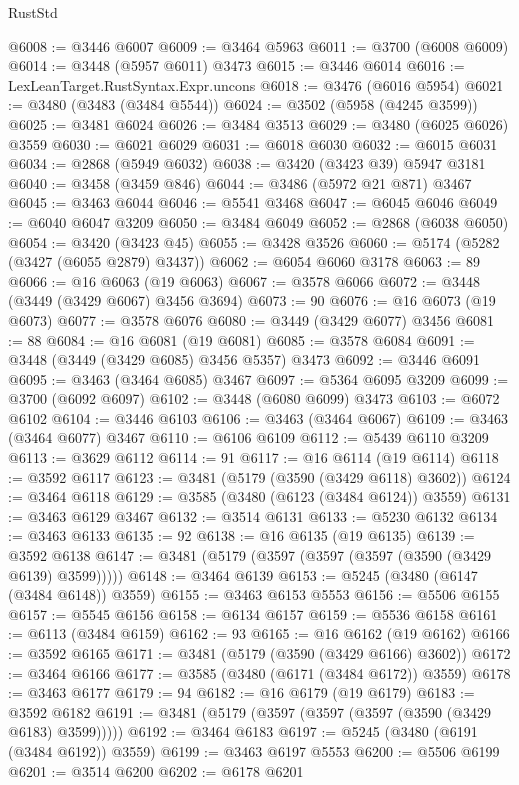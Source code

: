 \begin{lexlean}{RustStd}
\begin{coremodule}
{\begin{coremodule}
{{{{{{{{{{{{{{{{{{{{{{{{{{{{{{{{{{{{{{{{{{{{{{{{{{{{{{{{{{{{{{{{{{{{{{{{{{{{{{{{{{{{{@6008 := @3446 @6007
@6009 := @3464 @5963
@6011 := @3700 (@6008 @6009)
@6014 := @3448 (@5957 @6011) @3473
@6015 := @3446 @6014
@6016 := LexLeanTarget.RustSyntax.Expr.uncons
@6018 := @3476 (@6016 @5954)
@6021 := @3480 (@3483 (@3484 @5544))
@6024 := @3502 (@5958 (@4245 @3599))
@6025 := @3481 @6024
@6026 := @3484 @3513
@6029 := @3480 (@6025 @6026) @3559
@6030 := @6021 @6029
@6031 := @6018 @6030
@6032 := @6015 @6031
@6034 := @2868 (@5949 @6032)
@6038 := @3420 (@3423 @39) @5947 @3181
@6040 := @3458 (@3459 @846)
@6044 := @3486 (@5972 @21 @871) @3467
@6045 := @3463 @6044
@6046 := @5541 @3468
@6047 := @6045 @6046
@6049 := @6040 @6047 @3209
@6050 := @3484 @6049
@6052 := @2868 (@6038 @6050)
@6054 := @3420 (@3423 @45)
@6055 := @3428 @3526
@6060 := @5174 (@5282 (@3427 (@6055 @2879) @3437))
@6062 := @6054 @6060 @3178
@6063 := 89
@6066 := @16 @6063 (@19 @6063)
@6067 := @3578 @6066
@6072 := @3448 (@3449 (@3429 @6067) @3456 @3694)
@6073 := 90
@6076 := @16 @6073 (@19 @6073)
@6077 := @3578 @6076
@6080 := @3449 (@3429 @6077) @3456
@6081 := 88
@6084 := @16 @6081 (@19 @6081)
@6085 := @3578 @6084
@6091 := @3448 (@3449 (@3429 @6085) @3456 @5357) @3473
@6092 := @3446 @6091
@6095 := @3463 (@3464 @6085) @3467
@6097 := @5364 @6095 @3209
@6099 := @3700 (@6092 @6097)
@6102 := @3448 (@6080 @6099) @3473
@6103 := @6072 @6102
@6104 := @3446 @6103
@6106 := @3463 (@3464 @6067)
@6109 := @3463 (@3464 @6077) @3467
@6110 := @6106 @6109
@6112 := @5439 @6110 @3209
@6113 := @3629 @6112
@6114 := 91
@6117 := @16 @6114 (@19 @6114)
@6118 := @3592 @6117
@6123 := @3481 (@5179 (@3590 (@3429 @6118) @3602))
@6124 := @3464 @6118
@6129 := @3585 (@3480 (@6123 (@3484 @6124)) @3559)
@6131 := @3463 @6129 @3467
@6132 := @3514 @6131
@6133 := @5230 @6132
@6134 := @3463 @6133
@6135 := 92
@6138 := @16 @6135 (@19 @6135)
@6139 := @3592 @6138
@6147 := @3481 (@5179 (@3597 (@3597 (@3597 (@3590 (@3429 @6139) @3599)))))
@6148 := @3464 @6139
@6153 := @5245 (@3480 (@6147 (@3484 @6148)) @3559)
@6155 := @3463 @6153 @5553
@6156 := @5506 @6155
@6157 := @5545 @6156
@6158 := @6134 @6157
@6159 := @5536 @6158
@6161 := @6113 (@3484 @6159)
@6162 := 93
@6165 := @16 @6162 (@19 @6162)
@6166 := @3592 @6165
@6171 := @3481 (@5179 (@3590 (@3429 @6166) @3602))
@6172 := @3464 @6166
@6177 := @3585 (@3480 (@6171 (@3484 @6172)) @3559)
@6178 := @3463 @6177
@6179 := 94
@6182 := @16 @6179 (@19 @6179)
@6183 := @3592 @6182
@6191 := @3481 (@5179 (@3597 (@3597 (@3597 (@3590 (@3429 @6183) @3599)))))
@6192 := @3464 @6183
@6197 := @5245 (@3480 (@6191 (@3484 @6192)) @3559)
@6199 := @3463 @6197 @5553
@6200 := @5506 @6199
@6201 := @3514 @6200
@6202 := @6178 @6201
}}}}}}}}}}}}}}}}}}}}}}}}}}}}}}}}}}}}}}}}}}}}}}}}}}}}}}}}}}}}}}}}}}}}}}}}}}}}}}}}}}}}}
\end{coremodule}}
\end{coremodule}
\end{lexlean}

